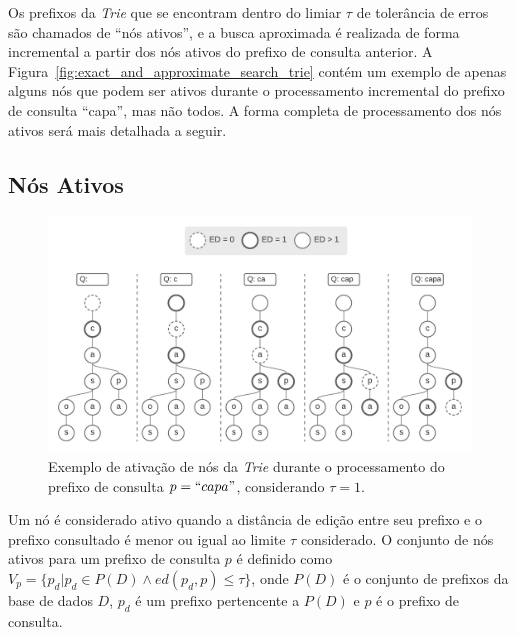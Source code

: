 Os prefixos da \textit{Trie} que se encontram dentro do limiar $\tau$ de tolerância de erros são chamados de ``nós ativos'', e a busca aproximada é realizada de forma incremental a partir dos nós ativos do prefixo de consulta anterior. A Figura~\ref{fig:exact_and_approximate_search_trie} contém um exemplo de apenas alguns nós que podem ser ativos durante o processamento incremental do prefixo de consulta ``capa'', mas não todos. A forma completa de processamento dos nós ativos será mais detalhada a seguir.

\subsection{Nós Ativos}
\label{sec:active_nodes}

\begin{figure}[ht]
    \centering
    \includegraphics[width=1\textwidth]{figures/trie_active_nodes_example.png}
    \caption{Exemplo de ativação de nós da \textit{Trie} durante o processamento do prefixo de consulta $p = ``capa"$, considerando $\tau = 1$. }
    \label{fig:active_nodes_example}
\end{figure}

Um nó é considerado ativo quando a distância de edição entre seu prefixo e o prefixo consultado é menor ou igual ao limite $\tau$ considerado. O conjunto de nós ativos para um prefixo de consulta $p$ é definido como $V_{p} = \{p_{d} | p_{d} \in P(D) \land ed(p_{d}, p) \leq \tau \}$, onde $P(D)$ é o conjunto de prefixos da base de dados $D$, $p_{d}$ é um prefixo pertencente a $P(D)$ e $p$ é o prefixo de consulta. 

